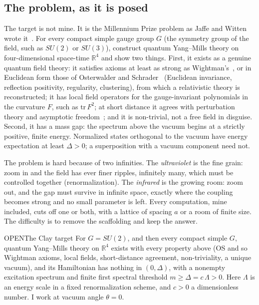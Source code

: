 \subsection*{The problem, as it is posed}

The target is not mine. It is the Millennium Prize problem as Jaffe and Witten wrote it~\cite{JaffeWitten}. For every
compact simple gauge group $G$ (the symmetry group of the field, such as $SU(2)$ or $SU(3)$), construct quantum
Yang--Mills theory on four-dimensional space-time $\mathbb R^4$ and show two things. First, it exists as a genuine
quantum field theory: it satisfies axioms at least as strong as Wightman's~\cite{StreaterWightman}, or in Euclidean form
those of Osterwalder and Schrader~\cite{OS73,OS75} (Euclidean invariance, reflection positivity, regularity, clustering),
from which a relativistic theory is reconstructed; it has local field operators for the gauge-invariant polynomials in
the curvature $F$, such as $\mathrm{tr}\,F^2$; at short distance it agrees with perturbation theory and asymptotic
freedom~\cite{GrossWilczek73,Politzer73}; and it is non-trivial, not a free field in disguise. Second, it has a mass gap:
the spectrum above the vacuum begins at a strictly positive, finite energy. Normalized states
orthogonal to the vacuum have energy expectation at least $\Delta>0$; a superposition with a vacuum component need not.

The problem is hard because of two infinities. The \emph{ultraviolet} is the fine grain: zoom in and the field has ever
finer ripples, infinitely many, which must be controlled together (renormalization). The \emph{infrared} is the growing
room: zoom out, and the gap must survive in infinite space, exactly where the coupling becomes strong and no small
parameter is left. Every computation, mine included, cuts off one or both, with a lattice of spacing $a$ or a room of
finite size. The difficulty is to remove the scaffolding and keep the answer.

\begin{claim}{OPEN}{The Clay target}\label{b:clay}
For $G=SU(2)$, and then every compact simple $G$, quantum Yang--Mills theory on $\mathbb R^4$ exists with every
property above (OS and so Wightman axioms, local fields, short-distance agreement, non-triviality, a unique vacuum), and
its Hamiltonian has nothing in $(0,\Delta)$, with a nonempty excitation spectrum and finite first spectral threshold
$m\ge\Delta=c\,\Lambda>0$. Here $\Lambda$ is an energy scale in a fixed renormalization scheme,
and $c>0$ a dimensionless number. I work at vacuum angle $\theta=0$.
\end{claim}

